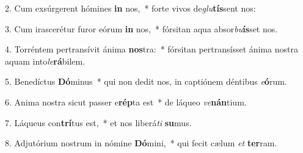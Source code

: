 2. Cum exsúrgerent hómines \textbf{in} nos,~*  forte vivos de\textit{glu}\textbf{tís}sent nos:\

3. Cum irascerétur furor eórum \textbf{in} nos,~*  fórsitan aqua absor\textit{bu}\textbf{ís}set nos.\

4. Torréntem pertransívit ánima \textbf{nos}tra:~*  fórsitan pertransísset ánima nostra aquam into\textit{le}\textbf{rá}bilem.\

5. Benedíctus \textbf{Dó}minus~*  qui non dedit nos, in captiónem déntibus \textit{e}\textbf{ó}rum.\

6. Anima nostra sicut passer e\textbf{rép}ta est~*  de láqueo \textit{ve}\textbf{nán}tium.\

7. Láqueus con\textbf{trí}tus est,~*  et nos liberá\textit{ti} \textbf{su}mus.\

8. Adjutórium nostrum in nómine \textbf{Dó}mini,~*  qui fecit cælum \textit{et} \textbf{ter}ram.\

